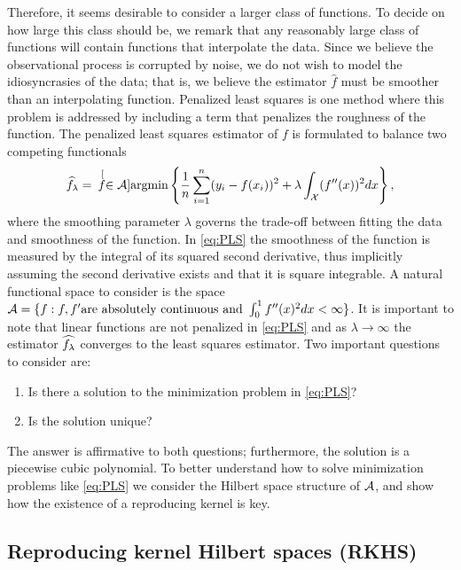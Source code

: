 Therefore, it seems desirable to consider a larger class of functions. To decide on how large this class should be, we remark that any reasonably large class of functions will contain functions that interpolate the data. Since we believe the observational process is corrupted by noise, we do not wish to model the idiosyncrasies of the data; that is,  we believe the estimator $\hat{f}$ must be smoother than an interpolating function. Penalized least squares is one method where this problem is addressed by including a term that penalizes the roughness of the function. The penalized least squares estimator of $f$ is formulated to balance two competing functionals 
\begin{equation}
\widehat{f}_{\lambda} = \hspace{.07in}\stackrel[f \in \mathcal{A}]{}{\mbox{argmin}} \left\{ \frac{1}{n}\sum_{i=1}^{n}(y_i - f(x_i))^2 + \lambda\int_{\mathcal{X}}(f''(x))^2dx \right\},
\label{eq:PLS}
\end{equation}
where the smoothing parameter $\lambda$ governs the trade-off between fitting the data and smoothness of the function. In \eqref{eq:PLS} the smoothness of the function is measured by the integral of its squared second derivative, thus implicitly assuming the second derivative exists and that it is square integrable. A natural functional space to consider is the space $\mathcal{A} = \{f: f, f' \mbox{are absolutely continuous and } \int_0^1f''(x)^2dx <\infty\}$. It is important to note that linear functions are not penalized in \eqref{eq:PLS} and as $\lambda \rightarrow \infty$ the estimator $\widehat{f_{\lambda}}$ converges to the least squares estimator. Two important questions to consider are: 
\begin{enumerate}
	\item Is there a solution to the minimization problem in \eqref{eq:PLS}?
	\item Is the solution unique?
\end{enumerate}
The answer is affirmative to both questions; furthermore, the solution is a piecewise cubic polynomial.  To better understand how to solve minimization problems like \eqref{eq:PLS} we consider the Hilbert space structure of $\mathcal{A}$, and show how the existence of a reproducing kernel is key. 
 

\subsection{Reproducing kernel Hilbert spaces (RKHS)}

